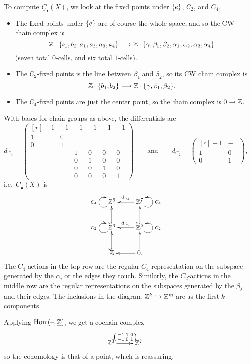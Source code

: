 \begin{exm}
To compute $\underline C_\bullet(X)$, we look at the fixed points under $\{e\}$, $C_2$, and $C_4$.
\begin{itemize}
	\item The fixed points under $\{e\}$ are of course the whole space, and so the CW chain complex is
	\[\mathbb Z\cdot\{b_1,b_2,a_1,a_2,a_3,a_4\}\longrightarrow \mathbb Z\cdot
	\{\gamma,\beta_1,\beta_2,\alpha_1,\alpha_2,\alpha_3,\alpha_4\}\]
	(seven total $0$-cells, and six total $1$-cells).
	\item The $C_2$-fixed points is the line between $\beta_1$ and $\beta_2$, so its CW chain complex is
	\[\mathbb Z\cdot\{b_1,b_2\}\longrightarrow \mathbb Z\cdot\{\gamma, \beta_1,\beta_2\}.\]
	\item The $C_4$-fixed points are just the center point, so the chain complex is $0\to\mathbb Z$.
\end{itemize}
With bases for chain groups as above, the differentials are
\[d_{C_4} = \begin{pmatrix*}[r]
	-1 & -1 & -1 & -1 & -1 & -1\\
	1 & 0\\0 & 1\\
	&& 1 & 0 & 0 & 0\\
	&&0& 1 & 0 & 0\\
	&&0&0& 1 & 0\\
	&&0&0&0& 1
\end{pmatrix*} \qquad\text{and}\qquad
d_{C_2} = \begin{pmatrix*}[r]
	-1 & -1\\
	1 & 0\\0 & 1
\end{pmatrix*},
\]
i.e.\ $\underline C_\bullet(X)$ is
\[\xymatrix{
	\ar@(dl,ul)^{C_4}\Z^6 & \Z^7\ar[l]_{d_{C_4}}\ar@(dr,ur)_{C_4}\\
	\Z^3\ar@(dl,ul)^{C_2}\ar@{^(->}[u] & \Z^2\ar@{^(->}[u]\ar[l]_{d_{C_2}}\ar@(dr,ur)_{C_2}\\
	\Z\ar@{^(->}[u] & 0.\ar[l]\ar[u]
}\]
The $C_4$-actions in the top row are the regular $C_4$-representation on the subspace generated by the $\alpha_i$
or the edges they touch. Similarly, the $C_2$-actions in the middle row are the regular representations on the
subspaces generated by the $\beta_j$ and their edges. The inclusions in the diagram $\mathbb Z^k\hookrightarrow\mathbb Z^m$ are as the first
$k$ components.

Applying $\operatorname{Hom}(\text{--},\underline{\mathbb Z})$, we get a cochain complex
\[\xymatrix{
	\Z^3\ar[r]^{\begin{psmallmatrix*}-1 & 1 & 0\\-1 & 0 & 1\end{psmallmatrix*}} & \Z^2.
}\]
so the cohomology is that of a point, which is reassuring.
\end{exm}
